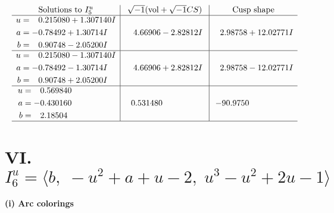 \documentclass[1p]{elsarticle_modified}
\theoremstyle{definition}
\newcommand{\I}{\sqrt{-1}}
\begin{document}
$$\begin{array}{c|c|c}  
\text{Solutions to }I^u_{5}& \I (\text{vol} + \sqrt{-1}CS) & \text{Cusp shape}\\
 \hline 
\begin{aligned}
u &= \phantom{-}0.215080 + 1.307140 I \\
a &= -0.78492 + 1.30714 I \\
b &= \phantom{-}0.90748 - 2.05200 I\end{aligned}
 & \phantom{-}4.66906 - 2.82812 I & \phantom{-}2.98758 + 12.02771 I \\ \hline\begin{aligned}
u &= \phantom{-}0.215080 - 1.307140 I \\
a &= -0.78492 - 1.30714 I \\
b &= \phantom{-}0.90748 + 2.05200 I\end{aligned}
 & \phantom{-}4.66906 + 2.82812 I & \phantom{-}2.98758 - 12.02771 I \\ \hline\begin{aligned}
u &= \phantom{-}0.569840\phantom{ +0.000000I} \\
a &= -0.430160\phantom{ +0.000000I} \\
b &= \phantom{-}2.18504\phantom{ +0.000000I}\end{aligned}
 & \phantom{-}0.531480\phantom{ +0.000000I} & -90.9750\phantom{ +0.000000I}\\
 \hline 
 \end{array}$$\newpage\newpage\renewcommand{\arraystretch}{1}
\centering \section*{VI. $I^u_{6}= \langle b,\;- u^2+a+u-2,\;u^3- u^2+2 u-1 \rangle$}
\flushleft \textbf{(i) Arc colorings}\\
\end{document}
